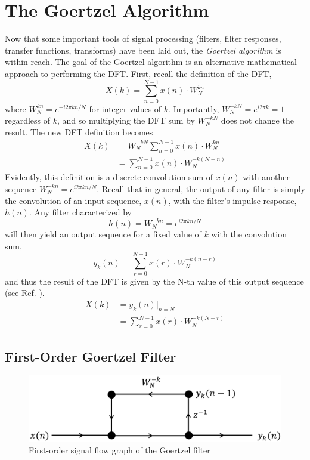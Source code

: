 \documentclass[reprint,amsmath,amssymb]{revtex4-2}
\begin{document}
\section{The Goertzel Algorithm}

Now that some important tools of signal processing (filters, filter responses, transfer functions, transforms) have been laid out, the \textit{Goertzel algorithm} is within reach. The goal of the Goertzel algorithm is an alternative mathematical approach to performing the DFT. First, recall the definition of the DFT,
$$
    X(k) = \sum_{n=0}^{N-1}{x(n)\cdot W_N^{kn}}
$$
where $W_N^{kn} = e^{-i2\pi kn/N}$ for integer values of $k$. Importantly, $W_N^{-kN} = e^{i2\pi k} = 1$ regardless of $k$, and so multiplying the DFT sum by $W_N^{-kN}$ does not change the result. The new DFT definition becomes
\begin{align}
    X(k) & = W_N^{-kN} \sum_{n=0}^{N-1}{x(n)\cdot W_N^{kn}}\nonumber \\
         & = \sum_{n=0}^{N-1}{x(n)\cdot W_N^{-k(N-n)}}
\end{align}
Evidently, this definition is a discrete convolution sum of $x(n)$ with another sequence $W_N^{-kn} = e^{i2\pi kn/N}$. Recall that in general, the output of any filter is simply the convolution of an input sequence, $x(n)$, with the filter's impulse response, $h(n)$. Any filter characterized by 
\begin{equation}
    h(n) = W_N^{-kn} = e^{i2\pi kn/N}
\end{equation}
 will then yield an output sequence for a fixed value of $k$ with the convolution sum,
 \begin{equation}
     y_k(n) = \sum_{r=0}^{N-1}{x(r)\cdot W_N^{-k(n-r)}}
 \end{equation}
 and thus the result of the DFT is given by the N-th value of this output sequence (see Ref. \cite{DSP}).
 \begin{align}
     X(k) & = y_k(n)|_{n=N} 
    \nonumber \\
     & = \sum_{r=0}^{N-1}{x(r)\cdot W_N^{-k(N-r)}}
 \end{align}

\subsection{First-Order Goertzel Filter}

\begin{figure}
    \centering
    \includegraphics[width=\linewidth]{figs/goertzel_network1.png}
    \caption{First-order signal flow graph of the Goertzel filter}
    \label{fig:4}
\end{figure}
\end{document}
